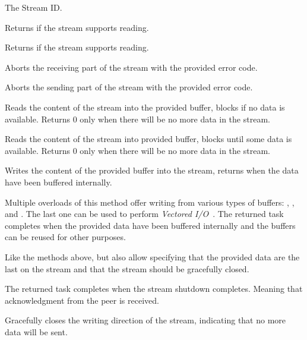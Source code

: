 \begin{description}

     The Stream ID\@.

     Returns  if the stream supports
reading.

     Returns  if the stream supports
reading.

     Aborts the receiving part of the stream with the
provided error code.

     Aborts the sending part of the stream with the
provided error code.

     Reads the content of the stream into the
provided buffer, blocks if no data is available. Returns 0 only when there will be no more data in
the stream.

Reads the content of the stream into provided buffer, blocks until some data is available. Returns 0
only when there will be no more data in the stream.

     Writes the content of the provided buffer
into the stream, returns when the data have been buffered internally.

Multiple overloads of this method offer writing from various types of buffers:
\ReadOnlyMemoryOf{\Byte{}}, \ReadOnlySequenceOf{\Byte{}}, and
. The last one can be used to
perform \textit{Vectored I/O}~\cite{wiki:vectored-io}\@. The returned task completes when the
provided data have been buffered internally and the buffers can be reused for other purposes.

     Like the methods above, but also allow specifying that the provided data are the last on
the stream and that the stream should be gracefully closed.

     The returned task
completes when the stream shutdown completes. Meaning that acknowledgment from the peer is received.

     Gracefully closes the writing direction of the stream,
indicating that no more data will be sent.

\end{description}

